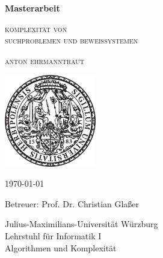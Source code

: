 \pagestyle{empty}

\begin{center}{

\vfill

{\large\textbf{Masterarbeit}}\par
    \vspace*{1cm}
{\LARGE\textsc{komplexität von\\suchproblemen und beweissystemen}}\par
    \vspace*{.3cm}
{\large\textsc{anton ehrmanntraut}}\par}
\vspace*{5cm}

\includegraphics[width=4cm]{siegel.pdf}

\vspace*{2cm}


{\large\today}\vspace*{.7cm}

{\large Betreuer: Prof. Dr. Christian Glaßer}\vspace*{.5cm}


{\large
Julius-Maximilians-Universität Würzburg\\
Lehrstuhl für Informatik I\\
Algorithmen und Komplexität
}


\end{center}

\cleardoublepage
\restoregeometry

\tableofcontents
\thispagestyle{empty}
\cleardoublepage
{}
\pagestyle{main}

